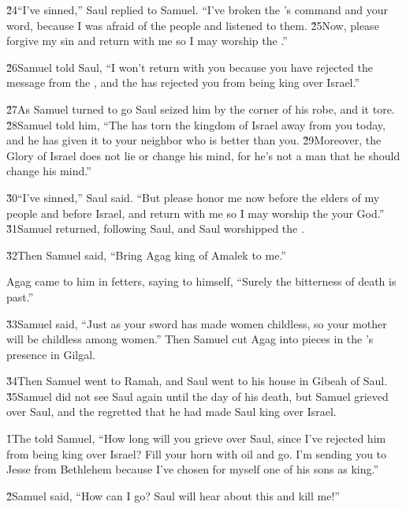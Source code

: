 \v{24}``I've sinned,'' Saul replied to Samuel. ``I've broken the 's command and your word, because I was afraid of the people and listened to them. \v{25}Now, please forgive my sin and return with me so I may worship the .''

\v{26}Samuel told Saul, ``I won't return with you because you have rejected the message from the , and the  has rejected you from being king over Israel.''

\v{27}As Samuel turned to go Saul seized him by the corner of his robe, and it tore. \v{28}Samuel told him, ``The  has torn the kingdom of Israel away from you today, and he has given it to your neighbor who is better than you. \v{29}Moreover, the Glory of Israel does not lie or change his mind, for he's not a man that he should change his mind.''

\v{30}``I've sinned,'' Saul said. ``But please honor me now before the elders of my people and before Israel, and return with me so I may worship the  your God.'' \v{31}Samuel returned, following Saul, and Saul worshipped the .

\v{32}Then Samuel said, ``Bring Agag king of Amalek to me.''

Agag came to him in fetters, saying to himself, ``Surely the bitterness of death is past.''

\v{33}Samuel said, ``Just as your sword has made women childless, so your mother will be childless among women.'' Then Samuel cut Agag into pieces in the 's presence in Gilgal.

\v{34}Then Samuel went to Ramah, and Saul went to his house in Gibeah of Saul. \v{35}Samuel did not see Saul again until the day of his death, but Samuel grieved over Saul, and the  regretted that he had made Saul king over Israel.

\v{1}The  told Samuel, ``How long will you grieve over Saul, since I've rejected him from being king over Israel? Fill your horn with oil and go. I'm sending you to Jesse from Bethlehem because I've chosen for myself one of his sons as king.''

\v{2}Samuel said, ``How can I go? Saul will hear about this and kill me!''

